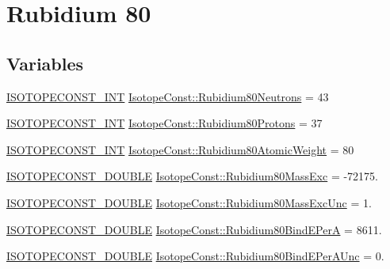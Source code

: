 \hypertarget{group___isotope_const-_rubidium-_rb80}{}\section{Rubidium 80}
\label{group___isotope_const-_rubidium-_rb80}
\subsection*{Variables}
\begin{DoxyCompactItemize}
\item 
\mbox{\hyperlink{group___isotope_const-_macros_ga5f18360b3e99483a35c32d789e62621c}{I\+S\+O\+T\+O\+P\+E\+C\+O\+N\+S\+T\+\_\+\+I\+NT}} \mbox{\hyperlink{group___isotope_const-_rubidium-_rb80_gabf78c82f63bfb01d27f1be5c07024efc}{Isotope\+Const\+::\+Rubidium80\+Neutrons}} = 43
\item 
\mbox{\hyperlink{group___isotope_const-_macros_ga5f18360b3e99483a35c32d789e62621c}{I\+S\+O\+T\+O\+P\+E\+C\+O\+N\+S\+T\+\_\+\+I\+NT}} \mbox{\hyperlink{group___isotope_const-_rubidium-_rb80_ga4d3ceafef15028b3632022e0a966a113}{Isotope\+Const\+::\+Rubidium80\+Protons}} = 37
\item 
\mbox{\hyperlink{group___isotope_const-_macros_ga5f18360b3e99483a35c32d789e62621c}{I\+S\+O\+T\+O\+P\+E\+C\+O\+N\+S\+T\+\_\+\+I\+NT}} \mbox{\hyperlink{group___isotope_const-_rubidium-_rb80_ga19cea9e3c7a907ff05656c27151f1992}{Isotope\+Const\+::\+Rubidium80\+Atomic\+Weight}} = 80
\item 
\mbox{\hyperlink{group___isotope_const-_macros_ga8f45a7272ce02c0b4c65c44636ed719a}{I\+S\+O\+T\+O\+P\+E\+C\+O\+N\+S\+T\+\_\+\+D\+O\+U\+B\+LE}} \mbox{\hyperlink{group___isotope_const-_rubidium-_rb80_ga21c453bfefe8210f30c63924abc4e0d2}{Isotope\+Const\+::\+Rubidium80\+Mass\+Exc}} = -\/72175.
\item 
\mbox{\hyperlink{group___isotope_const-_macros_ga8f45a7272ce02c0b4c65c44636ed719a}{I\+S\+O\+T\+O\+P\+E\+C\+O\+N\+S\+T\+\_\+\+D\+O\+U\+B\+LE}} \mbox{\hyperlink{group___isotope_const-_rubidium-_rb80_gad179cc8e23992c23e0cacf6ea04b55f9}{Isotope\+Const\+::\+Rubidium80\+Mass\+Exc\+Unc}} = 1.
\item 
\mbox{\hyperlink{group___isotope_const-_macros_ga8f45a7272ce02c0b4c65c44636ed719a}{I\+S\+O\+T\+O\+P\+E\+C\+O\+N\+S\+T\+\_\+\+D\+O\+U\+B\+LE}} \mbox{\hyperlink{group___isotope_const-_rubidium-_rb80_gaf5cd5c5e20f6e216db54cf96b3db2369}{Isotope\+Const\+::\+Rubidium80\+Bind\+E\+PerA}} = 8611.
\item 
\mbox{\hyperlink{group___isotope_const-_macros_ga8f45a7272ce02c0b4c65c44636ed719a}{I\+S\+O\+T\+O\+P\+E\+C\+O\+N\+S\+T\+\_\+\+D\+O\+U\+B\+LE}} \mbox{\hyperlink{group___isotope_const-_rubidium-_rb80_gabc347cbfd197b2507dc8e45477cd0ec3}{Isotope\+Const\+::\+Rubidium80\+Bind\+E\+Per\+A\+Unc}} = 0.

\end{DoxyCompactItemize}
